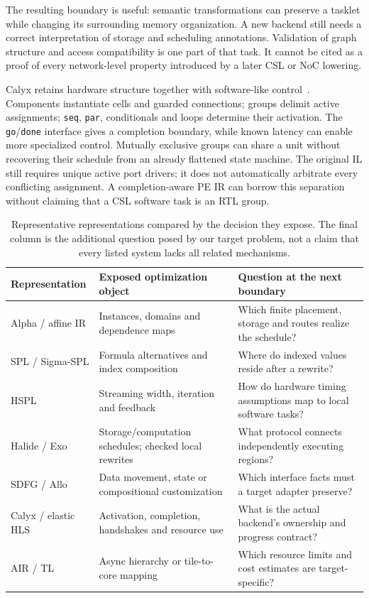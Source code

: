 \documentclass[final,3p,times,authoryear]{elsarticle}
\begin{document}
The resulting boundary is useful: semantic transformations can preserve a tasklet while changing its surrounding memory organization. A new backend still needs a correct interpretation of storage and scheduling annotations. Validation of graph structure and access compatibility is one part of that task. It cannot be cited as a proof of every network-level property introduced by a later CSL or NoC lowering.

Calyx retains hardware structure together with software-like control~\citep{nigam2021}. Components instantiate cells and guarded connections; groups delimit active assignments; \texttt{seq}, \texttt{par}, conditionals and loops determine their activation. The \texttt{go}/\texttt{done} interface gives a completion boundary, while known latency can enable more specialized control. Mutually exclusive groups can share a unit without recovering their schedule from an already flattened state machine. The original IL still requires unique active port drivers; it does not automatically arbitrate every conflicting assignment. A completion-aware PE IR can borrow this separation without claiming that a CSL software task is an RTL group.

\begin{table}[t]
\caption{Representative representations compared by the decision they expose. The final column is the additional question posed by our target problem, not a claim that every listed system lacks all related mechanisms.}
\label{tab:representations}
\small
\begin{tabularx}{\linewidth}{@{}>{\raggedright\arraybackslash}p{2.1cm}XX@{}}
\toprule
Representation & Exposed optimization object & Question at the next boundary \\
\midrule
Alpha / affine IR & Instances, domains and dependence maps & Which finite placement, storage and routes realize the schedule? \\
SPL / Sigma-SPL & Formula alternatives and index composition & Where do indexed values reside after a rewrite? \\
HSPL & Streaming width, iteration and feedback & How do hardware timing assumptions map to local software tasks? \\
Halide / Exo & Storage/computation schedules; checked local rewrites & What protocol connects independently executing regions? \\
SDFG / Allo & Data movement, state or compositional customization & Which interface facts must a target adapter preserve? \\
Calyx / elastic HLS & Activation, completion, handshakes and resource use & What is the actual backend's ownership and progress contract? \\
AIR / TL & Async hierarchy or tile-to-core mapping & Which resource limits and cost estimates are target-specific? \\
\bottomrule
\end{tabularx}
\end{table}
\end{document}
